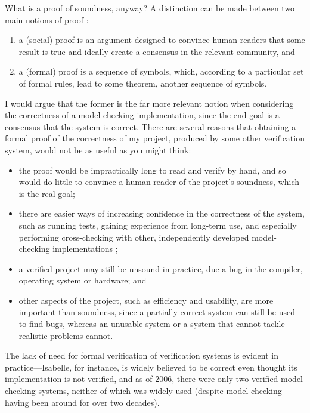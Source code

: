 \documentclass[12pt,a4paper,twoside,openright]{report}
\begin{document}
What is a proof of soundness, anyway?
A distinction can be made between two
main notions of proof \cite[p.~2]{buss98}:
\begin{enumerate}
	\item a (social) proof is an argument
	designed to convince human readers that some
	result is true and ideally create a consensus
	in the relevant community, and
	\item a (formal) proof is a sequence of
	symbols, which, according to a particular
	set of formal rules, lead to some
	theorem, another sequence of symbols.
\end{enumerate}
I would argue that the former is the far more
relevant notion when considering the
correctness of a model-checking implementation,
since the end goal is a consensus that the
system is correct.
There are several reasons that obtaining a formal
proof of the correctness of my project,
produced by some other verification system,
would not be as useful as you might think:
\begin{itemize}
	\item the proof would be impractically
	long to read and verify by hand, and so
	would do little to convince a human reader
	of the project's soundness, which is the real
	goal;
	\item there are easier ways of increasing
	confidence in the correctness of the system,
	such as running tests, gaining 
	experience from long-term use, and
	especially performing cross-checking
	with other,
	independently developed
	model-checking implementations \cite{tau02};
	\item a verified project may still be
	unsound in practice, due a bug
	in the compiler, operating system or
	hardware; and
	\item other aspects of the project,
	such as efficiency and usability, are
	more important than soundness, since
	a partially-correct system can still
	be used to find bugs, whereas an
	unusable system or a system that
	cannot tackle realistic problems
	cannot.
\end{itemize}

The lack of need for formal verification of
verification systems is evident in
practice---Isabelle, for instance, is widely
believed to be correct even thought its
implementation is not verified, and
as of 2006, there were only
two verified model checking
systems, neither of which was widely
used \cite{beck06} (despite model
checking having been around for
over two decades). 
\end{document}
